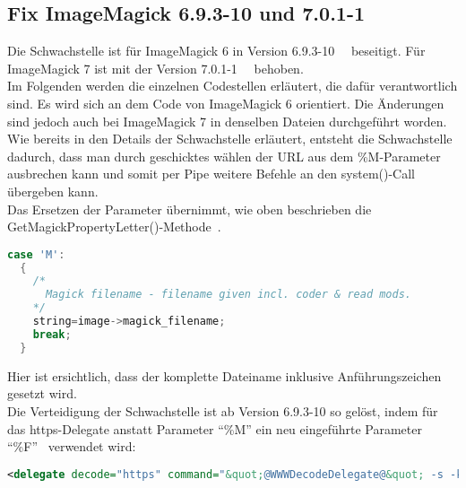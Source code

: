 \subsection{Fix ImageMagick 6.9.3-10 und 7.0.1-1}\label{subsec:fix-imagemagick-6.9.3-10}

Die Schwachstelle ist für ImageMagick 6 in Version 6.9.3-10~\cite{Fix6A}~\cite{Fix6B} beseitigt.
Für ImageMagick 7 ist mit der Version 7.0.1-1~\cite{Fix7A}~\cite{Fix7B} behoben.\\
Im Folgenden werden die einzelnen Codestellen erläutert, die dafür verantwortlich sind.
Es wird sich an dem Code von ImageMagick 6 orientiert.
Die Änderungen sind jedoch auch bei ImageMagick 7 in denselben Dateien durchgeführt worden.  \\

Wie bereits in den Details der Schwachstelle erläutert, entsteht die Schwachstelle dadurch, dass man durch geschicktes wählen der URL aus dem \%M-Parameter ausbrechen kann und somit per Pipe weitere Befehle an den system()-Call übergeben kann.\\

Das Ersetzen der Parameter übernimmt, wie oben beschrieben die GetMagickPropertyLetter()-Methode~\cite{DeklarationGetMgickPropertyLetter}.

\begin{lstlisting}[firstnumber=2627, language=C, caption=magick/property.c Ungefilterte Weitergabe M-Parameter,label={lst:lstlisting}]
  case 'M':
  {
    /*
      Magick filename - filename given incl. coder & read mods.
    */
    string=image->magick_filename;
    break;
  }
\end{lstlisting}
\vspace{5mm}

Hier ist ersichtlich, dass der komplette Dateiname inklusive Anführungszeichen gesetzt wird.\\

Die Verteidigung der Schwachstelle ist ab Version 6.9.3-10 so gelöst, indem für das https-Delegate anstatt Parameter "`\%M"' ein neu eingeführte Parameter "`\%F"'~\cite{CompareDelegatexXML} verwendet wird:\\

\begin{lstlisting}[firstnumber=91, language=XML, caption=config/delegates.xml.in https-Delegate 6.9.3-10,label={lst:lstlisting}]
  <delegate decode="https" command="&quot;@WWWDecodeDelegate@&quot; -s -k -L -o &quot;%o&quot; &quot;https:%F&quot;"/>
\end{lstlisting}
\vspace{5mm}

